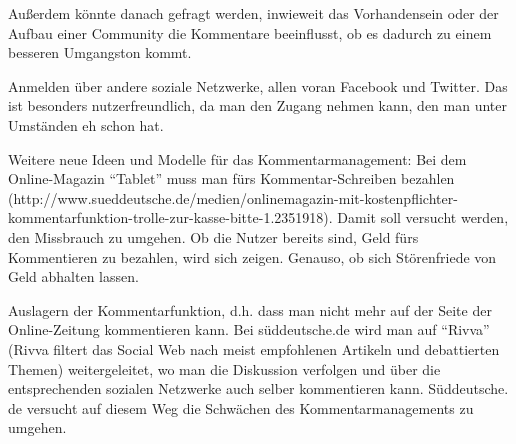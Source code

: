 Außerdem könnte danach gefragt werden, inwieweit
das Vorhandensein oder der Aufbau einer Community die Kommentare beeinflusst, ob es dadurch zu einem besseren Umgangston kommt. 
 

Anmelden über andere soziale Netzwerke, allen voran Facebook und Twitter. Das ist besonders nutzerfreundlich, da man den Zugang nehmen kann, den man unter Umständen eh schon hat. 




Weitere neue Ideen und Modelle für das Kommentarmanagement:
Bei dem Online-Magazin ``Tablet'' muss man fürs Kommentar-Schreiben bezahlen (http://www.sueddeutsche.de/\-me\-dien/onlinemagazin-mit-kostenpflichter-kommentarfunktion-trolle-zur-kasse-bitte-1.2351918).
Damit soll versucht werden, den Missbrauch zu umgehen. Ob die Nutzer bereits sind, Geld fürs Kommentieren zu bezahlen, wird sich zeigen. Genauso, ob sich Störenfriede von Geld abhalten lassen.


Auslagern der Kommentarfunktion, d.h. dass man nicht mehr auf der Seite der Online-Zeitung kommentieren kann. Bei süddeutsche.de wird man auf ``Rivva'' (Rivva filtert das Social Web nach meist empfohlenen Artikeln und debattierten Themen) weitergeleitet, wo man die Diskussion verfolgen und über die entsprechenden sozialen Netzwerke auch selber kommentieren kann. Süddeutsche. de versucht auf diesem Weg die Schwächen des Kommentarmanagements zu umgehen. 

